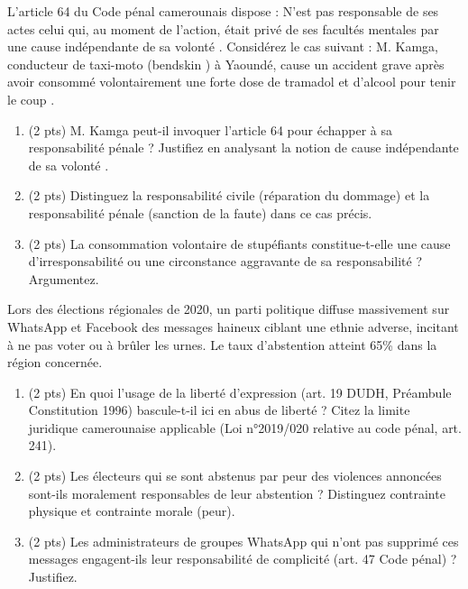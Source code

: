 \documentclass[11pt]{article}
\begin{document}
\begin{exercice}
L'article 64 du Code pénal camerounais dispose : \og N'est pas responsable de ses actes celui qui, au moment de l'action, était privé de ses facultés mentales par une cause indépendante de sa volonté \fg{}. Considérez le cas suivant : M. Kamga, conducteur de taxi-moto (\og bendskin \fg{}) à Yaoundé, cause un accident grave après avoir consommé volontairement une forte dose de tramadol et d'alcool pour \og tenir le coup \fg{}.
\begin{enumerate}
    \item (2 pts) M. Kamga peut-il invoquer l'article 64 pour échapper à sa responsabilité pénale ? Justifiez en analysant la notion de \og cause indépendante de sa volonté \fg{}.
    \item (2 pts) Distinguez la responsabilité civile (réparation du dommage) et la responsabilité pénale (sanction de la faute) dans ce cas précis.
    \item (2 pts) La consommation volontaire de stupéfiants constitue-t-elle une cause d'irresponsabilité ou une circonstance aggravante de sa responsabilité ? Argumentez.
\end{enumerate}
\end{exercice}

\begin{exercice}
Lors des élections régionales de 2020, un parti politique diffuse massivement sur WhatsApp et Facebook des messages haineux ciblant une ethnie adverse, incitant à ne pas voter ou à brûler les urnes. Le taux d'abstention atteint 65\% dans la région concernée.
\begin{enumerate}
    \item (2 pts) En quoi l'usage de la liberté d'expression (art. 19 DUDH, Préambule Constitution 1996) bascule-t-il ici en abus de liberté ? Citez la limite juridique camerounaise applicable (Loi n°2019/020 relative au code pénal, art. 241).
    \item (2 pts) Les électeurs qui se sont abstenus par peur des violences annoncées sont-ils moralement responsables de leur abstention ? Distinguez contrainte physique et contrainte morale (peur).
    \item (2 pts) Les administrateurs de groupes WhatsApp qui n'ont pas supprimé ces messages engagent-ils leur responsabilité de \og complicité \fg{} (art. 47 Code pénal) ? Justifiez.
\end{enumerate}
\end{exercice}
\end{document}
